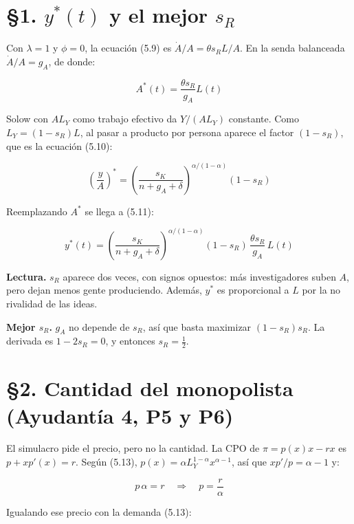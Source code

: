 \documentclass[11pt,a4paper]{article}
\begin{document}
\section*{§1. $y^*(t)$ y el mejor $s_R$}

Con $\lambda = 1$ y $\phi = 0$, la ecuación (5.9) es $\dot A/A = \theta s_R L/A$. En la senda balanceada $\dot A/A = g_A$, de donde:

\begin{equation*}A^*(t) = \frac{\theta s_R}{g_A} L(t)\end{equation*}

Solow con $AL_Y$ como trabajo efectivo da $Y/(AL_Y)$ constante. Como $L_Y = (1-s_R)L$, al pasar a producto por persona aparece el factor $(1-s_R)$, que es la ecuación (5.10):

\begin{equation*}\left(\frac{y}{A}\right)^* = \left(\frac{s_K}{n+g_A+\delta}\right)^{\alpha/(1-\alpha)} (1-s_R)\end{equation*}

Reemplazando $A^*$ se llega a (5.11):

\begin{equation*}y^*(t) = \left(\frac{s_K}{n+g_A+\delta}\right)^{\alpha/(1-\alpha)} (1-s_R)\, \frac{\theta s_R}{g_A}\, L(t)\end{equation*}

\textbf{Lectura.} $s_R$ aparece dos veces, con signos opuestos: más investigadores suben $A$, pero dejan menos gente produciendo. Además, $y^*$ es proporcional a $L$ por la no rivalidad de las ideas.

\textbf{Mejor $s_R$.} $g_A$ no depende de $s_R$, así que basta maximizar $(1-s_R)s_R$. La derivada es $1 - 2s_R = 0$, y entonces $s_R = \tfrac{1}{2}$.

\section*{§2. Cantidad del monopolista (Ayudantía 4, P5 y P6)}

El simulacro pide el precio, pero no la cantidad. La CPO de $\pi = p(x)x - rx$ es $p + xp'(x) = r$. Según (5.13), $p(x) = \alpha L_Y^{1-\alpha} x^{\alpha-1}$, así que $xp'/p = \alpha - 1$ y:

\begin{equation*}p\,\alpha = r \quad\Rightarrow\quad p = \frac{r}{\alpha}\end{equation*}

Igualando ese precio con la demanda (5.13):
\end{document}
